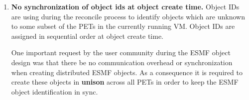 %


\begin{enumerate}
\item{\bf No synchronization of object ids at object create time.}
Object IDs are using during the reconcile process to identify objects
which are unknown to some subset of the PETs in the currently running VM.
Object IDs are assigned in sequential order at object create time.

One important request by the user community during the ESMF object design was
that there be no communication overhead or synchronization when creating
distributed ESMF objects. As a consequence it is required to create these
objects in {\bf unison} across all PETs in order to keep the ESMF object
identification in sync.

\end{enumerate}



